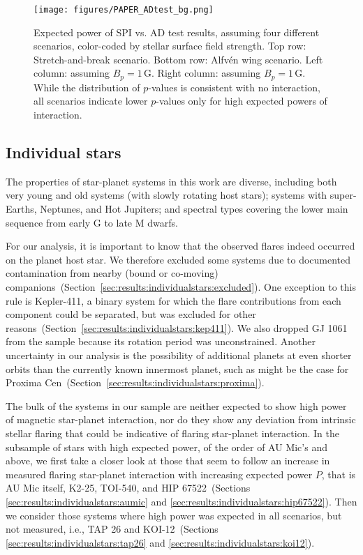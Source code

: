 \documentclass[twocolumn]{aastex631}
\begin{document}
\begin{figure*}[ht!]
    \begin{centering}
        \texttt{[image: figures/PAPER\_ADtest\_bg.png]}
        \caption{
            Expected power of SPI vs. AD test results, assuming four different scenarios, color-coded by stellar surface field strength. Top row: Stretch-and-break scenario. Bottom row: Alfv\'en wing scenario. Left column: assuming $B_p=1\,$G. Right column: assuming $B_p=1\,$G. While the distribution of $p$-values is consistent with no interaction, all scenarios indicate lower $p$-values only for high expected powers of interaction.
        }
        \label{fig:adtest_bp}
    \end{centering}
\end{figure*}



\subsection{Individual stars}
\label{sec:results:individualstars}
The properties of star-planet systems in this work are diverse, including both very young and old systems (with slowly rotating host stars); systems with super-Earths, Neptunes, and Hot Jupiters; and spectral types covering the lower main sequence from early G to late M dwarfs. 

For our analysis, it is important to know that the observed flares indeed occurred on the planet host star. We therefore excluded some systems due to documented contamination from nearby (bound or co-moving) companions~(Section~\ref{sec:results:individualstars:excluded}). One exception to this rule is Kepler-411, a binary system for which the flare contributions from each component could be separated, but was excluded for other reasons~(Section~\ref{sec:results:individualstars:kep411}). We also dropped GJ 1061 from the sample because its rotation period was unconstrained. Another uncertainty in our analysis is the possibility of additional planets at even shorter orbits than the currently known innermost planet, such as might be the case for Proxima Cen~(Section~\ref{sec:results:individualstars:proxima}). 

The bulk of the systems in our sample are neither expected to show high power of magnetic star-planet interaction, nor do they show any deviation from intrinsic stellar flaring that could be indicative of flaring star-planet interaction. In the subsample of stars with high expected power, of the order of AU Mic's and above, we first take a closer look at those that seem to follow an increase in measured flaring star-planet interaction with increasing expected power $P$, that is AU Mic itself, K2-25, TOI-540, and HIP 67522~(Sections \ref{sec:results:individualstars:aumic} and \ref{sec:results:individualstars:hip67522}). Then we consider those systems where high power was expected in all scenarios, but not measured, i.e., TAP 26 and KOI-12~(Sections \ref{sec:results:individualstars:tap26} and \ref{sec:results:individualstars:koi12}).
\end{document}
